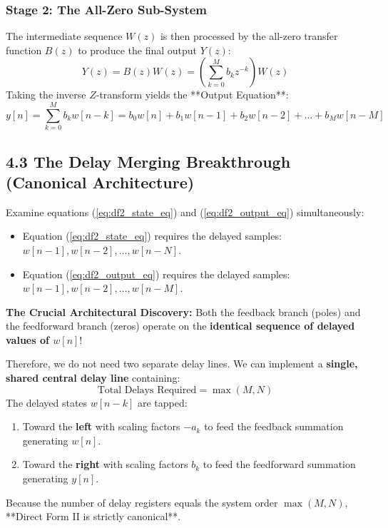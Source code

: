 \documentclass[11pt,a4paper]{article}
\begin{document}
\subsubsection{Stage 2: The All-Zero Sub-System}
The intermediate sequence $W(z)$ is then processed by the all-zero transfer function $B(z)$ to produce the final output $Y(z)$:
\begin{equation}
Y(z) = B(z) W(z) = \left( \sum_{k=0}^{M} b_k z^{-k} \right) W(z)
\end{equation}
Taking the inverse $Z$-transform yields the **Output Equation**:
\begin{equation}
y[n] = \sum_{k=0}^{M} b_k w[n-k] = b_0 w[n] + b_1 w[n-1] + b_2 w[n-2] + \dots + b_M w[n-M]
\label{eq:df2_output_eq}
\end{equation}

\subsection{4.3 The Delay Merging Breakthrough (Canonical Architecture)}
Examine equations (\ref{eq:df2_state_eq}) and (\ref{eq:df2_output_eq}) simultaneously:
\begin{itemize}
    \item Equation (\ref{eq:df2_state_eq}) requires the delayed samples: $w[n-1], w[n-2], \dots, w[n-N]$.
    \item Equation (\ref{eq:df2_output_eq}) requires the delayed samples: $w[n-1], w[n-2], \dots, w[n-M]$.
\end{itemize}
\textbf{The Crucial Architectural Discovery:}
Both the feedback branch (poles) and the feedforward branch (zeros) operate on the \textbf{identical sequence of delayed values of $w[n]$}!

Therefore, we do not need two separate delay lines. We can implement a \textbf{single, shared central delay line} containing:
\begin{equation}
\text{Total Delays Required} = \max(M, N)
\end{equation}
The delayed states $w[n-k]$ are tapped:
\begin{enumerate}
    \item Toward the \textbf{left} with scaling factors $-a_k$ to feed the feedback summation generating $w[n]$.
    \item Toward the \textbf{right} with scaling factors $b_k$ to feed the feedforward summation generating $y[n]$.
\end{enumerate}

Because the number of delay registers equals the system order $\max(M, N)$, **Direct Form II is strictly canonical**.
\end{document}
